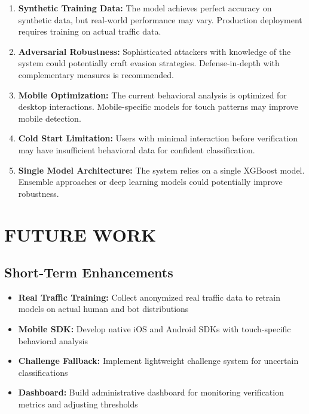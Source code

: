 \begin{enumerate}
    \item \textbf{Synthetic Training Data:} The model achieves perfect accuracy on synthetic data, but real-world performance may vary. Production deployment requires training on actual traffic data.
    
    \item \textbf{Adversarial Robustness:} Sophisticated attackers with knowledge of the system could potentially craft evasion strategies. Defense-in-depth with complementary measures is recommended.
    
    \item \textbf{Mobile Optimization:} The current behavioral analysis is optimized for desktop interactions. Mobile-specific models for touch patterns may improve mobile detection.
    
    \item \textbf{Cold Start Limitation:} Users with minimal interaction before verification may have insufficient behavioral data for confident classification.
    
    \item \textbf{Single Model Architecture:} The system relies on a single XGBoost model. Ensemble approaches or deep learning models could potentially improve robustness.
\end{enumerate}

\section{FUTURE WORK}

\subsection{Short-Term Enhancements}

\begin{itemize}
    \item \textbf{Real Traffic Training:} Collect anonymized real traffic data to retrain models on actual human and bot distributions
    
    \item \textbf{Mobile SDK:} Develop native iOS and Android SDKs with touch-specific behavioral analysis
    
    \item \textbf{Challenge Fallback:} Implement lightweight challenge system for uncertain classifications
    
    \item \textbf{Dashboard:} Build administrative dashboard for monitoring verification metrics and adjusting thresholds
\end{itemize}

